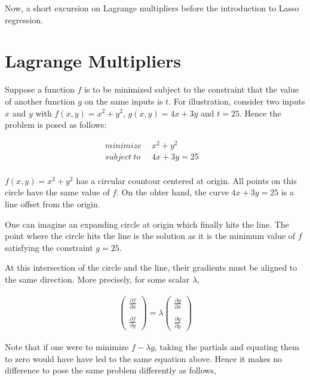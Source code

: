 \documentclass[11pt, a4paper]{article}
\begin{document}
Now, a short excursion on Lagrange multipliers before the  introduction to Lasso regression.

\section{Lagrange Multipliers}

Suppose a function $f$ is to be minimized subject to the constraint that the value of another function $g$ on the same inputs is $t$. For illustration, consider two inputs $x$ and $y$ with $f(x, y) = x^2 + y^2$, $g(x, y) = 4x + 3y$ and $t = 25$. Hence the problem is posed as follows:

\begin{align*}
	minimize\ \ &x^2 + y^2 &              \\
	subject\ to\ \ &4x + 3y = 25 &              \\
\end{align*}

$f(x, y) = x^2 + y^2$ has a circular countour centered at origin. All points on this circle have the same value of $f$. On the ohter hand, the curve $4x + 3y = 25$ is a line offset from the origin. 

One can imagine an expanding circle at origin which finally hits the line. The point where the circle hits the line is the solution as it is the minimum value of $f$ satisfying the constraint $g=25$. 

At this intersection of the circle and the line, their gradients must be aligned to the same direction. More precisely, for some scalar $\lambda$,

\begin{align*}
	\begin{pmatrix}\frac{\partial f}{\partial x} \\
	                                             \\  \frac{\partial f}{\partial y} \end{pmatrix} = \lambda  \begin{pmatrix}\frac{\partial g}{\partial x} \\ \\ \frac{\partial g}{\partial y} \end{pmatrix}
\end{align*}

Note that if one were to minimize $f - \lambda g$, taking the partials and equating them to zero would have have led to the same equation above. Hence it makes no difference to pose the same problem differently as follows,
\end{document}
